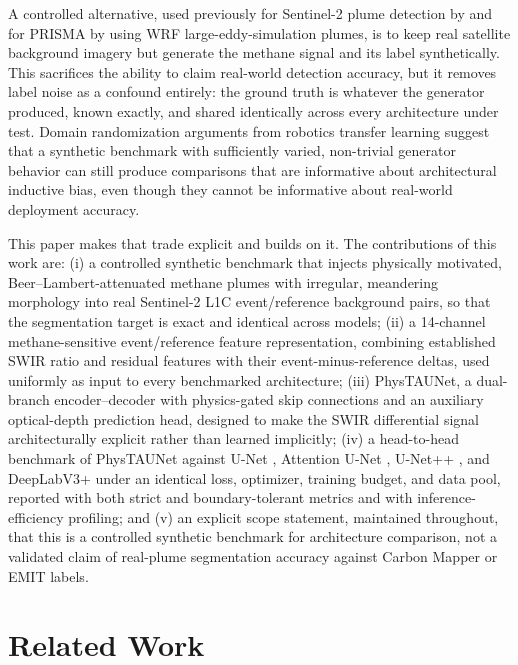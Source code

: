 \documentclass[10pt,twocolumn]{article}
\begin{document}
A controlled alternative, used previously for Sentinel-2 plume detection by \citet{rodriguezcuenca2023synthetic} and for PRISMA by \citet{joyce2023deep} using WRF large-eddy-simulation plumes, is to keep real satellite background imagery but generate the methane signal and its label synthetically. This sacrifices the ability to claim real-world detection accuracy, but it removes label noise as a confound entirely: the ground truth is whatever the generator produced, known exactly, and shared identically across every architecture under test. Domain randomization arguments from robotics transfer learning \citep{tobin2017domain} suggest that a synthetic benchmark with sufficiently varied, non-trivial generator behavior can still produce comparisons that are informative about architectural inductive bias, even though they cannot be informative about real-world deployment accuracy.

This paper makes that trade explicit and builds on it. The contributions of this work are: (i) a controlled synthetic benchmark that injects physically motivated, Beer--Lambert-attenuated methane plumes with irregular, meandering morphology into real Sentinel-2 L1C event/reference background pairs, so that the segmentation target is exact and identical across models; (ii) a 14-channel methane-sensitive event/reference feature representation, combining established SWIR ratio and residual features with their event-minus-reference deltas, used uniformly as input to every benchmarked architecture; (iii) PhysTAUNet, a dual-branch encoder--decoder with physics-gated skip connections and an auxiliary optical-depth prediction head, designed to make the SWIR differential signal architecturally explicit rather than learned implicitly; (iv) a head-to-head benchmark of PhysTAUNet against U-Net \citep{ronneberger2015unet}, Attention U-Net \citep{oktay2018attention}, U-Net++ \citep{zhou2018unetpp}, and DeepLabV3+ \citep{chen2018deeplabv3plus} under an identical loss, optimizer, training budget, and data pool, reported with both strict and boundary-tolerant metrics and with inference-efficiency profiling; and (v) an explicit scope statement, maintained throughout, that this is a controlled synthetic benchmark for architecture comparison, not a validated claim of real-plume segmentation accuracy against Carbon Mapper or EMIT labels.

\section{Related Work}
\label{sec:related}
\end{document}

